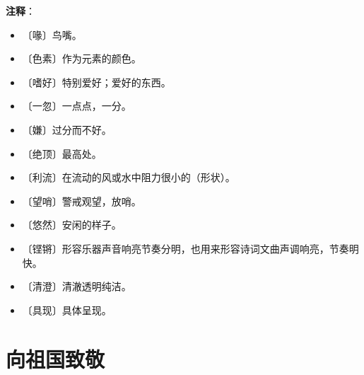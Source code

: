 \documentclass[12pt,UTF-8,openany]{ctexbook}
\begin{document}
\newpage

\textbf{注释}：

\vspace{-1em}

\begin{itemize}
    \setlength\itemsep{-0.2em}
    \item 〔喙〕鸟嘴。
    \item 〔色素〕作为元素的颜色。
    \item 〔嗜好〕特别爱好；爱好的东西。
    \item 〔一忽〕一点点，一分。
    \item 〔嫌〕过分而不好。
    \item 〔绝顶〕最高处。
    \item 〔利流〕在流动的风或水中阻力很小的（形状）。
    \item 〔望哨〕警戒观望，放哨。
    \item 〔悠然〕安闲的样子。
    \item 〔铿锵〕形容乐器声音响亮节奏分明，也用来形容诗词文曲声调响亮，节奏明快。
    \item 〔清澄〕清澈透明纯洁。
    \item 〔具现〕具体呈现。
\end{itemize}

\chapter{向祖国致敬}
\end{document}
